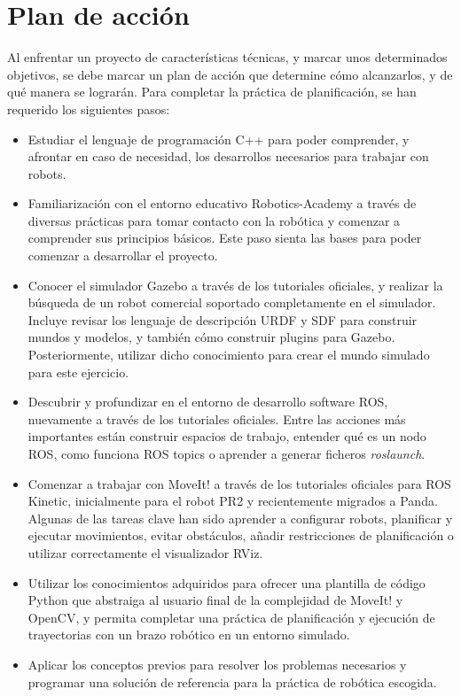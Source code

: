 \documentclass[12pt,spanish,chapterprefix, numbers=noenddot]{book}
\numberwithin{equation}{section}
\numberwithin{figure}{section}
\begin{document}
\section{Plan de acción}
Al enfrentar un proyecto de características técnicas, y marcar unos determinados objetivos, se debe marcar un plan de acción que determine cómo alcanzarlos, y de qué manera se lograrán. Para completar la práctica de planificación, se han requerido los siguientes pasos: 
\begin{itemize}
    \item Estudiar el lenguaje de programación C++ para poder comprender, y afrontar en caso de necesidad, los desarrollos necesarios para trabajar con robots.
    \item Familiarización con el entorno educativo Robotics-Academy a través de diversas prácticas para tomar contacto con la robótica y comenzar a comprender sus principios básicos. Este paso sienta las bases para poder comenzar a desarrollar el proyecto. 
    \item Conocer el simulador Gazebo a través de los tutoriales oficiales, y realizar la búsqueda de un robot comercial soportado completamente en el simulador. Incluye revisar los lenguaje de descripción URDF y SDF para construir mundos y modelos, y también cómo construir plugins para Gazebo. Posteriormente, utilizar dicho conocimiento para crear el mundo simulado para este ejercicio. 
    \item Descubrir y profundizar en el entorno de desarrollo software ROS, nuevamente a través de los tutoriales oficiales. Entre las acciones más importantes están construir espacios de trabajo, entender qué es un nodo ROS, como funciona ROS topics o aprender a generar ficheros \textit{roslaunch}.
    \item Comenzar a trabajar con MoveIt! a través de los tutoriales oficiales para ROS Kinetic, inicialmente para el robot PR2 y recientemente migrados a Panda. Algunas de las tareas clave han sido aprender a configurar robots, planificar y ejecutar movimientos, evitar obstáculos, añadir restricciones de planificación o utilizar correctamente el visualizador RViz. 
    \item Utilizar los conocimientos adquiridos para ofrecer una plantilla de código Python que abstraiga al usuario final de la complejidad de MoveIt! y OpenCV, y permita completar una práctica de planificación y ejecución de trayectorias con un brazo robótico en un entorno simulado. 
    \item Aplicar los conceptos previos para resolver los problemas necesarios y programar una solución de referencia para la práctica de robótica escogida.
    
\end{itemize}
\end{document}
